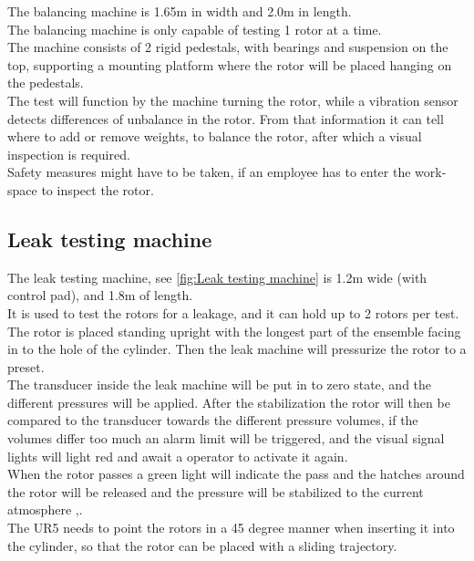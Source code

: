  The balancing machine is 1.65m in width and 2.0m in length.\\
 The balancing machine is only capable of testing 1 rotor at a time.\\
 The machine consists of 2 rigid pedestals, with bearings and suspension on the top, supporting a mounting platform where the rotor will be placed hanging on the pedestals.\\

The test will function by the machine turning the rotor, while a vibration sensor detects differences of unbalance in the rotor. From that information it can tell where to add or remove weights, to balance the rotor, after which a visual inspection is required.\\

Safety measures might have to be taken, if an employee has to enter the work-space to inspect the rotor.\\
 


 \subsection{Leak testing machine}
 
 The leak testing machine, see \ref{fig:Leak testing machine} is 1.2m wide (with control pad), and 1.8m of length.\\ 
 It is used to test the rotors for a leakage, and it can hold up to 2 rotors per test.\\
 The rotor is placed standing upright with the longest part of the ensemble facing in to the hole of the cylinder. Then the leak machine will pressurize the rotor to a preset.\\
 The transducer inside the leak machine will be put in to zero state, and the different pressures will be applied. After the stabilization the rotor will then be compared to the transducer towards the different pressure volumes, if the volumes differ too much an alarm limit will be triggered, and the visual signal lights will light red and await a operator to activate it again.\\
 When the rotor passes a green light will indicate the pass and the hatches around the rotor will be released and the pressure will be stabilized to the current atmosphere  \cite{LEAK},\cite{LEAK2}.\\
The UR5 needs to point the rotors in a 45 degree manner when inserting it into the cylinder, so that the rotor can be placed with a sliding trajectory.\\
 
